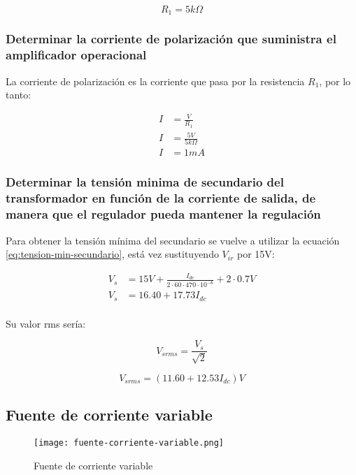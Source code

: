 \begin{equation}
    \boxed{R_{1} = 5k \Omega}
\end{equation}

\subsubsection{Determinar la corriente de polarización que suministra el amplificador operacional}

La corriente de polarización es la corriente que pasa por la resistencia $R_1$, por lo tanto:

\begin{align*}
    I &= \frac{V}{R_1}  \\
    I &= \frac{5V}{5k \Omega} \\
    I &= 1mA
\end{align*}

\subsubsection{Determinar la tensión minima de secundario del transformador en función de la corriente de salida, de manera que el regulador pueda mantener la regulación}

Para obtener la tensión mínima del secundario se vuelve a utilizar la ecuación \ref{eq:tension-min-secundario}, está vez sustituyendo $V_{ir}$ por 15V:

\begin{align*}
    V_s &= 15V + \frac{I_{dc}}{2\cdot 60 \cdot 470\cdot 10^{-6}} + 2 \cdot 0.7 V \\
    V_s &= 16.40 + 17.73  I_{dc} \\
\end{align*}

Su valor rms sería:

$$ V_{srms} = \frac{V_s}{\sqrt{2}} $$

$$ V_{srms} = (11.60 + 12.53 I_{dc} )V $$

\subsection{Fuente de corriente variable}

\begin{figure}[ht]
    \centering
    \texttt{[image: fuente-corriente-variable.png]}
    \caption{Fuente de corriente variable}
    \label{fig:fuente-corriente-variable}
\end{figure}


